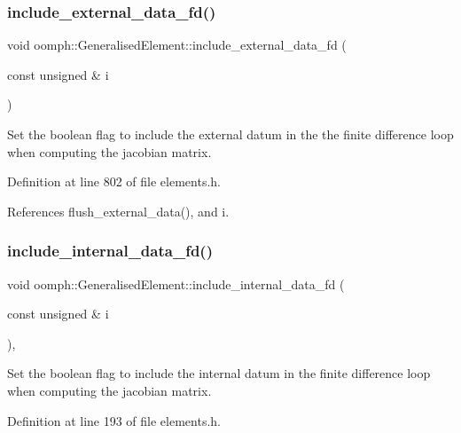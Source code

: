 \subsubsection{\texorpdfstring{include\+\_\+external\+\_\+data\+\_\+fd()}{include\_external\_data\_fd()}}
{\footnotesize\ttfamily void oomph\+::\+Generalised\+Element\+::include\+\_\+external\+\_\+data\+\_\+fd (\begin{DoxyParamCaption}\item[{const unsigned \&}]{i }\end{DoxyParamCaption})\hspace{0.3cm}{\ttfamily [inline]}}



Set the boolean flag to include the external datum in the the finite difference loop when computing the jacobian matrix. 



Definition at line 802 of file elements.\+h.



References flush\+\_\+external\+\_\+data(), and i.

\mbox{\label{classoomph_1_1GeneralisedElement_a76c12b675e16b3ad2f44a59af36aa2af}} 
\subsubsection{\texorpdfstring{include\+\_\+internal\+\_\+data\+\_\+fd()}{include\_internal\_data\_fd()}}
{\footnotesize\ttfamily void oomph\+::\+Generalised\+Element\+::include\+\_\+internal\+\_\+data\+\_\+fd (\begin{DoxyParamCaption}\item[{const unsigned \&}]{i }\end{DoxyParamCaption})\hspace{0.3cm}{\ttfamily [inline]}, {\ttfamily [protected]}}



Set the boolean flag to include the internal datum in the finite difference loop when computing the jacobian matrix. 



Definition at line 193 of file elements.\+h.




